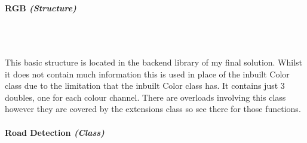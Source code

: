 \begin{FlushLeft}
    \bk

\paragraph{RGB \textit{(Structure)}} \mbox{} \\

    \begin{figure}[H]
        \centering
    \end{figure}\\

    This basic structure is located in the backend library of my final solution. Whilst it does not contain much information this is used in place of the inbuilt Color class due to the limitation that the inbuilt Color class has. It contains just 3 doubles, one for each colour channel. There are overloads involving this class however they are covered by the extensions class so see there for those functions.\\
    \bk

    \pagebreak
\paragraph{Road Detection \textit{(Class)}} \mbox{} \\

    \begin{figure}[H]
        \centering
    \end{figure}\\


\end{FlushLeft}
